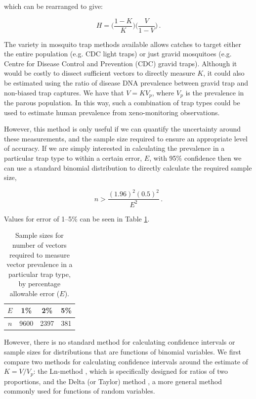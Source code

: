 which can be rearranged to give:

\begin{equation}
    H = \Bigg(\frac{1-K}{K}\Bigg)\Bigg(\frac{V}{1-V}\Bigg)\,.
    \label{eqn:H}
\end{equation}

The variety in mosquito trap methods available allows catches to target either the entire population (e.g. CDC light traps) or just gravid mosquitoes (e.g. Centre for Disease Control and Prevention (CDC) gravid traps). Although it would be costly to dissect sufficient vectors to directly measure $K$, it could also be estimated using the ratio of disease DNA prevalence between gravid trap and non-biased trap captures. We have that $V=KV_p$, where $V_p$ is the prevalence in the parous population. In this way, such a combination of trap types could be used to estimate human prevalence from xeno-monitoring observations.

However, this method is only useful if we can quantify the uncertainty around these measurements, and the sample size required to ensure an appropriate level of accuracy. If we are simply interested in calculating the prevalence in a particular trap type to within a certain error, $E$, with 95\% confidence then we can use a standard binomial distribution to directly calculate the required sample size,

\begin{equation}
    n > \frac{(1.96)^2(0.5)^2}{E^2}\,.
\end{equation}

Values for error of 1--5\% can be seen in Table \ref{tab:sampleV}.

\begin{table}[]
    \centering
    \begin{tabular}{c|c c c}
        $E$ & 1\% & 2\% & 5\% \\
        \hline
        $n$ & 9600 & 2397 & 381
    \end{tabular}
    \caption[Sample size calculations.]{Sample sizes for number of vectors required to measure vector prevalence in a particular trap type, by percentage allowable error ($E$).}
    \label{tab:sampleV}
\end{table}

However, there is no standard method for calculating confidence intervals or sample sizes for distributions that are functions of binomial variables. We first compare two methods for calculating confidence intervals around the estimate of $K=V/V_p$: the Ln-method \cite{Katz1978,Koopman1984}, which is specifically designed for ratios of two proportions, and the Delta (or Taylor) method \cite{Doob1935}, a more general method commonly used for functions of random variables. 

